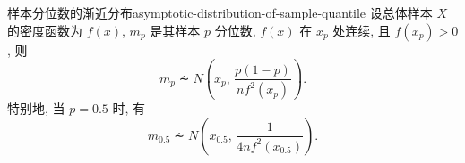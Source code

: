 \begin{newtheorembox}{样本分位数的渐近分布}{asymptotic-distribution-of-sample-quantile}
	设总体样本 $X$ 的密度函数为 $f(x)$, $m_p$ 是其样本 $p$ 分位数, $f(x)$ 在 $x_p$ 处连续, 且 $f(x_p)>0$, 则
	\[
		m_p\dotsim N\left(x_p,\,\frac{p(1-p)}{nf^2(x_p)}\right).
	\]
	特别地, 当 $p=0.5$ 时, 有
	\[
		m_{0.5}\dotsim N\left(x_{0.5},\,\frac{1}{4nf^2(x_{0.5})}\right).
	\]
\end{newtheorembox}

\newcommand{\GaDistri}[2]{\mathop{\mathrm{Ga}}\nolimits\left(#1,\,#2\right)}


\newcommand{\gammaFunc}[1]{%
	\pgfkeys{/pgf/fpu,/pgf/fpu/output format=fixed}%
  \pgfmathifisint{#1}{%
    \pgfmathparse{factorial(#1-1)}%
  }{%
		\pgfmathparse{#1-0.5}%
    \pgfmathparse{((2*\pgfmathresult)!)/(4^(\pgfmathresult)*factorial(\pgfmathresult))*sqrt(pi)}%
  }
}

